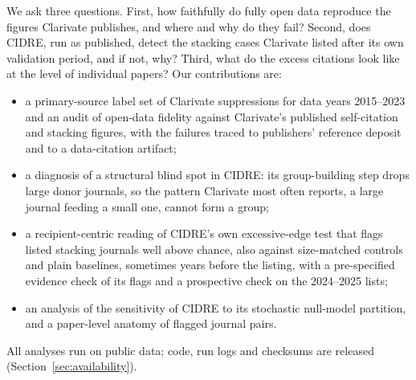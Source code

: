 We ask three questions. First, how faithfully do fully open data reproduce the figures Clarivate publishes, and where
and why do they fail? Second, does CIDRE, run as published, detect the stacking cases Clarivate listed after its
own validation period, and if not, why? Third, what do the excess citations look like at the level of individual
papers? Our contributions are:
\begin{itemize}
  \item a primary-source label set of Clarivate suppressions for data years 2015--2023 and an audit of open-data
        fidelity against Clarivate's published self-citation and stacking figures, with the failures traced to
        publishers' reference deposit and to a data-citation artifact;
  \item a diagnosis of a structural blind spot in CIDRE: its group-building step drops large donor journals, so the
        pattern Clarivate most often reports, a large journal feeding a small one, cannot form a group;
  \item a recipient-centric reading of CIDRE's own excessive-edge test that flags listed stacking journals well above
        chance, also against size-matched controls and plain baselines, sometimes years before the listing, with a
        pre-specified evidence check of its flags and a prospective check on the 2024--2025 lists;
  \item an analysis of the sensitivity of CIDRE to its stochastic null-model partition, and a paper-level anatomy of
        flagged journal pairs.
\end{itemize}
All analyses run on public data; code, run logs and checksums are released (Section~\ref{sec:availability}).

